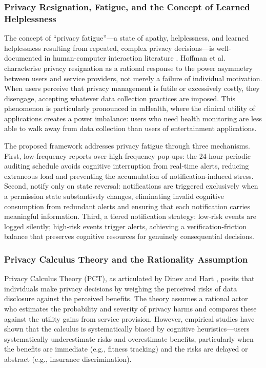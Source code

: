 \subsubsection{Privacy Resignation, Fatigue, and the Concept of Learned Helplessness}
The concept of ``privacy fatigue''—a state of apathy, helplessness, and learned helplessness resulting from repeated, complex privacy decisions—is well-documented in human-computer interaction literature \cite{10}. Hoffman et al. \cite{10} characterise privacy resignation as a rational response to the power asymmetry between users and service providers, not merely a failure of individual motivation. When users perceive that privacy management is futile or excessively costly, they disengage, accepting whatever data collection practices are imposed. This phenomenon is particularly pronounced in mHealth, where the clinical utility of applications creates a power imbalance: users who need health monitoring are less able to walk away from data collection than users of entertainment applications.

The proposed framework addresses privacy fatigue through three mechanisms. First, low-frequency reports over high-frequency pop-ups: the 24-hour periodic auditing schedule avoids cognitive interruption from real-time alerts, reducing extraneous load and preventing the accumulation of notification-induced stress. Second, notify only on state reversal: notifications are triggered exclusively when a permission state substantively changes, eliminating invalid cognitive consumption from redundant alerts and ensuring that each notification carries meaningful information. Third, a tiered notification strategy: low-risk events are logged silently; high-risk events trigger alerts, achieving a verification-friction balance that preserves cognitive resources for genuinely consequential decisions.

\subsubsection{Privacy Calculus Theory and the Rationality Assumption}
Privacy Calculus Theory (PCT), as articulated by Dinev and Hart \cite{8}, posits that individuals make privacy decisions by weighing the perceived risks of data disclosure against the perceived benefits. The theory assumes a rational actor who estimates the probability and severity of privacy harms and compares these against the utility gains from service provision. However, empirical studies have shown that the calculus is systematically biased by cognitive heuristics—users systematically underestimate risks and overestimate benefits, particularly when the benefits are immediate (e.g., fitness tracking) and the risks are delayed or abstract (e.g., insurance discrimination).

